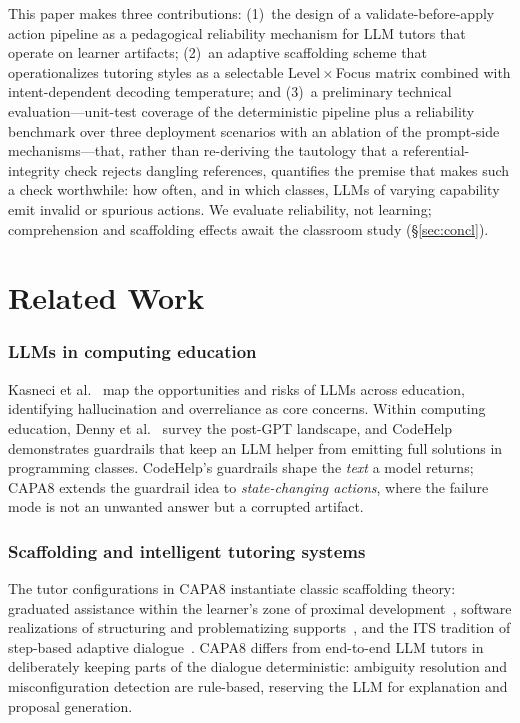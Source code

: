 \documentclass[conference,a4paper]{IEEEtran}
\begin{document}
This paper makes three contributions: (1)~the design of a validate-before-apply action pipeline as a pedagogical reliability mechanism for LLM tutors that operate on learner artifacts; (2)~an adaptive scaffolding scheme that operationalizes tutoring styles as a selectable Level\,$\times$\,Focus matrix combined with intent-dependent decoding temperature; and (3)~a preliminary technical evaluation---unit-test coverage of the deterministic pipeline plus a reliability benchmark over three deployment scenarios with an ablation of the prompt-side mechanisms---that, rather than re-deriving the tautology that a referential-integrity check rejects dangling references, quantifies the premise that makes such a check worthwhile: how often, and in which classes, LLMs of varying capability emit invalid or spurious actions. We evaluate reliability, not learning; comprehension and scaffolding effects await the classroom study (\S\ref{sec:concl}).

\section{Related Work}
\subsubsection*{LLMs in computing education}
Kasneci et al.~\cite{kasneci2023chatgpt} map the opportunities and risks of LLMs across education, identifying hallucination and overreliance as core concerns. Within computing education, Denny et al.~\cite{denny2024computing} survey the post-GPT landscape, and CodeHelp~\cite{liffiton2023codehelp} demonstrates guardrails that keep an LLM helper from emitting full solutions in programming classes. CodeHelp's guardrails shape the \emph{text} a model returns; CAPA8 extends the guardrail idea to \emph{state-changing actions}, where the failure mode is not an unwanted answer but a corrupted artifact.

\subsubsection*{Scaffolding and intelligent tutoring systems}
The tutor configurations in CAPA8 instantiate classic scaffolding theory: graduated assistance within the learner's zone of proximal development~\cite{vygotsky1978mind,wood1976role}, software realizations of structuring and problematizing supports~\cite{reiser2004scaffolding}, and the ITS tradition of step-based adaptive dialogue~\cite{vanlehn2011relative}. CAPA8 differs from end-to-end LLM tutors in deliberately keeping parts of the dialogue deterministic: ambiguity resolution and misconfiguration detection are rule-based, reserving the LLM for explanation and proposal generation.
\end{document}
